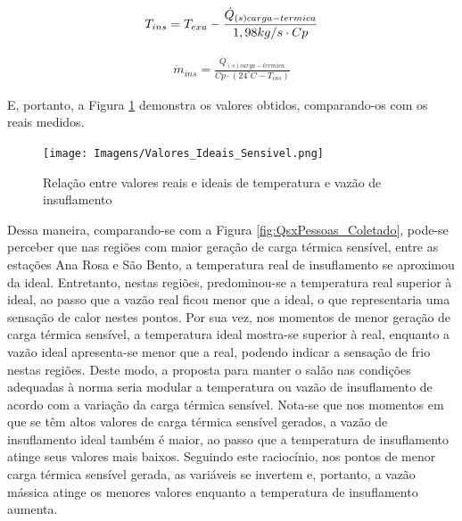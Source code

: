 \documentclass[acronym,symbols,table]{fei}
\begin{document}
\begin{equation} \label{eq:Tins_Ideal_Sensivel}
    \begin{aligned}
    T_{ins}=T_{exa} - \frac{\dot{Q}_{(s)carga-termica}}{1,98 \space kg/s \cdot Cp}
    \end{aligned}
\end{equation}

\begin{equation} \label{eq:mins_Ideal_Sensivel}
    \begin{aligned}
    \dot{m}_{ins}=\frac{\dot{Q}_{(s)carga-termica}}{Cp \cdot (24^\circ C -T_{ins})}
    \end{aligned}
\end{equation}

E, portanto, a Figura \ref{fig:Valores_Ideais_Sensivel} demonstra os valores obtidos, comparando-os com os reais medidos.

\begin{figure}[!htb]
    \centering
    \caption{Relação entre valores reais e ideais de temperatura e vazão de insuflamento}
    \texttt{[image: Imagens/Valores\_Ideais\_Sensivel.png]}
    \label{fig:Valores_Ideais_Sensivel}
\end{figure}

Dessa maneira, comparando-se com a Figura \ref{fig:QsxPessoas_Coletado}, pode-se perceber que nas regiões com maior geração de carga térmica sensível, entre as estações Ana Rosa e São Bento, a temperatura real de insuflamento se aproximou da ideal. Entretanto, nestas regiões, predominou-se a temperatura real superior à ideal, ao passo que a vazão real ficou menor que a ideal, o que representaria uma sensação de calor nestes pontos. Por sua vez, nos momentos de menor geração de carga térmica sensível, a temperatura ideal mostra-se superior à real, enquanto a vazão ideal apresenta-se menor que a real, podendo indicar a sensação de frio nestas regiões. Deste modo, a proposta para manter o salão nas condições adequadas à norma seria modular a temperatura ou vazão de insuflamento de acordo com a variação da carga térmica sensível. Nota-se que nos momentos em que se têm altos valores de carga térmica sensível gerados, a vazão de insuflamento ideal também é maior, ao passo que a temperatura de insuflamento atinge seus valores mais baixos. Seguindo este raciocínio, nos pontos de menor carga térmica sensível gerada, as variáveis se invertem e, portanto, a vazão mássica atinge os menores valores enquanto a temperatura de insuflamento aumenta. 
\end{document}
